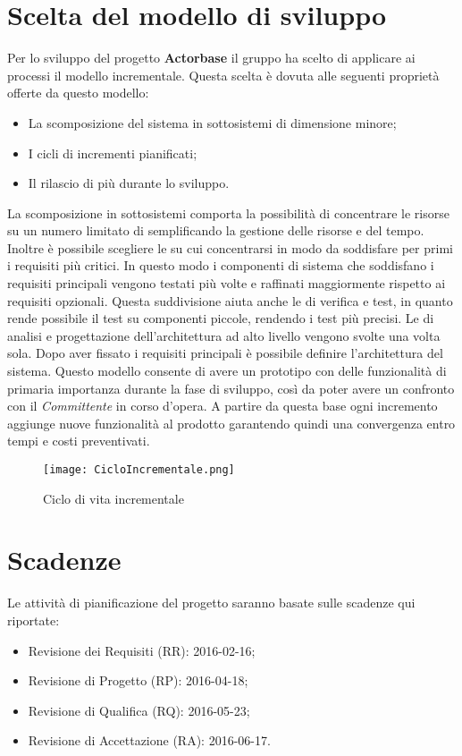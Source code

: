 \documentclass{scalatekids-article}
\begin{document}
\section{Scelta del modello di sviluppo}
Per lo sviluppo del progetto \textbf{Actorbase} il gruppo ha scelto di applicare
ai processi il modello incrementale. Questa scelta è dovuta alle seguenti
proprietà offerte da questo modello:
\begin{itemize}
\item {La scomposizione del sistema in sottosistemi di dimensione minore;}
\item {I cicli di incrementi pianificati;}
\item {Il rilascio di più  durante lo sviluppo.}
\end{itemize}
La scomposizione in sottosistemi comporta la possibilità di concentrare le
risorse su un numero limitato di  semplificando la gestione delle
risorse e del tempo. Inoltre è possibile scegliere le  su cui
concentrarsi in modo da soddisfare per primi i requisiti più critici. In questo
modo i componenti di sistema che soddisfano i requisiti principali vengono testati più
volte e raffinati maggiormente rispetto ai requisiti opzionali. Questa
suddivisione aiuta anche le  di verifica e test, in quanto rende possibile
il test su componenti piccole, rendendo i test più precisi. Le  di
analisi e progettazione dell'architettura ad alto livello vengono svolte una
volta sola. Dopo aver fissato i requisiti principali è possibile definire
l'architettura del sistema. Questo modello consente di avere un prototipo con
delle funzionalità di primaria importanza durante la fase di sviluppo, così da
poter avere un confronto con il \textit{Committente} in corso d'opera. A partire da
questa base ogni incremento aggiunge nuove funzionalità al prodotto garantendo
quindi una convergenza entro tempi e costi preventivati.
\begin{figure}[H]
  \begin{center}
    \texttt{[image: CicloIncrementale.png]}
    \caption*{Ciclo di vita incrementale}
  \end{center}
\end{figure}
\section{Scadenze}
Le attività di pianificazione del progetto saranno basate sulle scadenze qui riportate:
\begin{itemize}
\item {Revisione dei Requisiti (RR): 2016-02-16;}
\item {Revisione di Progetto (RP): 2016-04-18;}
\item {Revisione di Qualifica (RQ): 2016-05-23;}
\item {Revisione di Accettazione (RA): 2016-06-17.}
\end{itemize}
\end{document}
